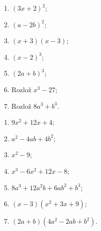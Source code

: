 \documentclass[11pt,a4paper]{article}
\begin{document}
\begin{zadaniReseniBox}[title={Domácí úkol}]
\begin{enumerate}[label=\alph*)]
\item $(3x+2)^2$;
\item $(a-2b)^2$;
\item $(x+3)(x-3)$;
\item $(x-2)^3$;
\item $(2a+b)^3$;
\item Rozlož $x^3-27$;
\item Rozlož $8a^3+b^3$.
\end{enumerate}
\tcblower
\begin{enumerate}[label=\alph*)]
\item $9x^2+12x+4$;
\item $a^2-4ab+4b^2$;
\item $x^2-9$;
\item $x^3-6x^2+12x-8$;
\item $8a^3+12a^2b+6ab^2+b^3$;
\item $(x-3)(x^2+3x+9)$;
\item $(2a+b)(4a^2-2ab+b^2)$.
\end{enumerate}
\end{zadaniReseniBox}
\end{document}
